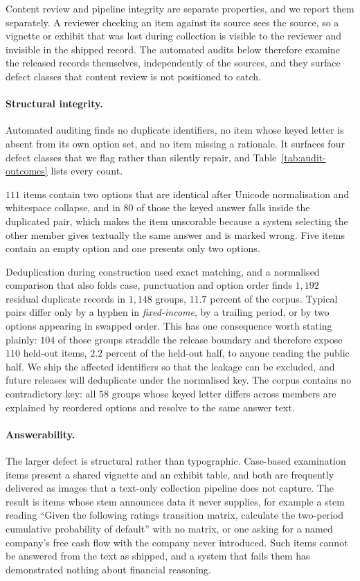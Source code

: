 Content review and pipeline integrity are separate properties, and we report them separately. A
reviewer checking an item against its source sees the source, so a vignette or exhibit that was
lost during collection is visible to the reviewer and invisible in the shipped record. The
automated audits below therefore examine the released records themselves, independently of the
sources, and they surface defect classes that content review is not positioned to catch.

\paragraph{Structural integrity.}
Automated auditing finds no duplicate identifiers, no item whose keyed letter is absent from its
own option set, and no item missing a rationale. It surfaces four defect classes that we flag
rather than silently repair, and Table~\ref{tab:audit-outcomes} lists every count.

$111$ items contain two options that are identical after Unicode normalisation and whitespace
collapse, and in $80$ of those the keyed answer falls inside the duplicated pair, which makes the
item unscorable because a system selecting the other member gives textually the same answer and
is marked wrong. Five items contain an empty option and one presents only two options.

Deduplication during construction used exact matching, and a normalised comparison that also
folds case, punctuation and option order finds $1{,}192$ residual duplicate records in $1{,}148$
groups, $11.7$ percent of the corpus. Typical pairs differ only by a hyphen in
\emph{fixed-income}, by a trailing period, or by two options appearing in swapped order. This has
one consequence worth stating plainly: $104$ of those groups straddle the release boundary and
therefore expose $110$ held-out items, $2.2$ percent of the held-out half, to anyone reading
the public half. We ship the affected identifiers so that the leakage can be excluded, and future
releases will deduplicate under the normalised key. The corpus contains no contradictory key:
all $58$ groups whose keyed letter differs across members are explained by reordered options and
resolve to the same answer text.

\paragraph{Answerability.}
The larger defect is structural rather than typographic. Case-based examination items present a
shared vignette and an exhibit table, and both are frequently delivered as images that a
text-only collection pipeline does not capture. The result is items whose stem announces data it
never supplies, for example a stem reading ``Given the following ratings transition matrix,
calculate the two-period cumulative probability of default'' with no matrix, or one asking for a
named company's free cash flow with the company never introduced. Such items cannot be answered
from the text as shipped, and a system that fails them has demonstrated nothing about financial
reasoning.

